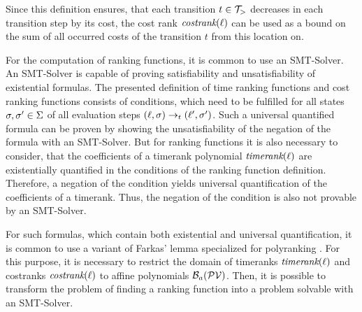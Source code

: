 Since this definition ensures, that each transition $t \in \mathcal{T}_>$ decreases in each transition step by its cost, the cost rank $\emph{costrank}(\ell)$ can be used as a bound on the sum of all occurred costs of the transition $t$ from this location on.


For the computation of ranking functions, it is common to use an SMT-Solver.
An SMT-Solver is capable of proving satisfiability and unsatisfiability of existential formulas.
The presented definition of time ranking functions and cost ranking functions consists of conditions, which need to be fulfilled for all states $\sigma, \sigma' \in \Sigma$ of all evaluation steps $(\ell, \sigma) \rightarrow_t (\ell', \sigma')$.
Such a universal quantified formula can be proven by showing the unsatisfiability of the negation of the formula with an SMT-Solver.
But for ranking functions it is also necessary to consider, that the coefficients of a timerank polynomial $\emph{timerank}(\ell)$ are existentially quantified in the conditions of the ranking function definition.
Therefore, a negation of the condition yields universal quantification of the coefficients of a timerank.
Thus, the negation of the condition is also not provable by an SMT-Solver.

For such formulas, which contain both existential and universal quantification, it is common to use a variant of Farkas' lemma \cite{schrijver1998theory} specialized for polyranking \cite{bradley2005polyranking}.
For this purpose, it is necessary to restrict the domain of timeranks $\emph{timerank}(\ell)$ and costranks $\emph{costrank}(\ell)$ to affine polynomials $\mathcal{B}_a(\mathcal{PV})$.
Then, it is possible to transform the problem of finding a ranking function into a problem solvable with an SMT-Solver.
